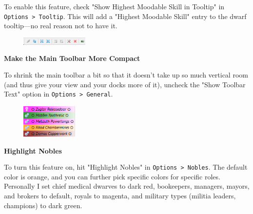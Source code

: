\documentclass[]{article}
\begin{document}
To enable this feature, check "Show Highest Moodable Skill in Tooltip" in \texttt{Options > Tooltip}.
This will add a "Highest Moodable Skill" entry to the dwarf tooltip---no real reason not to have it.
\vspace{12pt}

\begin{figure}
\vspace{-5pt}
  \begin{center}
    \includegraphics[width=0.3\textwidth]{Sec2Fig23}
  \end{center}
\vspace{-10pt}
\end{figure}
\noindent \textbf{Make the Main Toolbar More Compact}

To shrink the main toolbar a bit so that it doesn't take up so much vertical room (and thus give your
view and your docks more of it), uncheck the "Show Toolbar Text" option in \texttt{Options > General}.
\vspace{12pt}


\begin{figure}\vspace{-20pt}
  \begin{center}
    \includegraphics[width=0.25\textwidth]{Sec2Fig25}
  \end{center}
\vspace{-15pt}
\end{figure}
\noindent \textbf{Highlight Nobles}

To turn this feature on, hit "Highlight Nobles" in \texttt{Options > Nobles}. The default color is
orange, and you can further pick specific colors for specific roles. Personally I set chief medical
dwarves to dark red, bookeepers, managers, mayors, and brokers to default, royals to magenta, and
military types (militia leaders, champions) to dark green.
\vspace{12pt}
\end{document}
